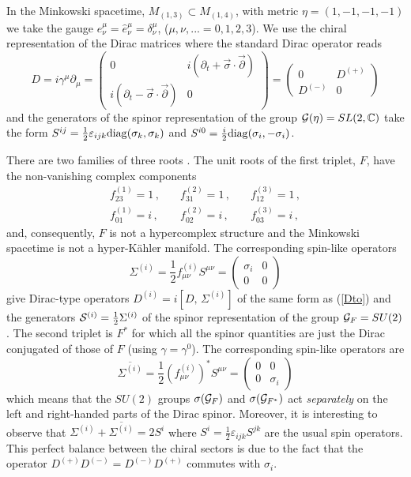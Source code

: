 \documentclass[a4paper,12pt]{article}
\begin{document}
In the Minkowski spacetime, $M_{(1,3)}\subset M_{(1,4)}$, with 
metric $\eta=(1,-1,-1,-1)$ we take the gauge 
$e^{\mu}_{\nu}=\hat e^{\mu}_{\nu}=\delta^{\mu}_{\nu}$, ($\mu,\nu,...=0,1,2,3$). 
We use the chiral representation of the Dirac matrices where the standard 
Dirac operator reads
\begin{equation}
D=i\gamma^{\mu}\partial_{\mu}=\left( 
\begin{array}{cc}
0&i(\partial_t+\vec{\sigma}\cdot\vec{\partial})\\
i(\partial_t-\vec{\sigma}\cdot\vec{\partial})&0
\end{array}\right)=\left(
\begin{array}{cc}
0&D^{(+)}\\
D^{(-)}&0
\end{array}\right)
\end{equation}
and the generators of the spinor representation of the group 
${\cal G}(\eta) = SL(2,{\Bbb C})$ take the form
$S^{ij}=\frac{1}{2}\varepsilon_{ijk}{\rm diag}(\sigma_k, \sigma_k)$
and $S^{i0}=\frac{i}{2}{\rm diag}(\sigma_i,-\sigma_i)$.

There are two families of three roots \cite{K2}. The unit roots of the first 
triplet, $F$, have the non-vanishing complex components \cite{K2}
\begin{eqnarray}
f^{(1)}_{23}=1\,,\quad&f^{(2)}_{31}=1\,,&\quad f^{(3)}_{12}=1\,,\\
f^{(1)}_{01}=i\,,\quad&f^{(2)}_{02}=i\,,&\quad f^{(3)}_{03}=i\,,
\end{eqnarray}
and, consequently, $F$ is not a hypercomplex structure and the Minkowski 
spacetime is not a hyper-K\" ahler manifold.
The corresponding spin-like operators
\begin{equation}
\Sigma^{(i)}=\frac{1}{2}f^{(i)}_{\mu\nu}S^{\mu\nu}=\left(
\begin{array}{cc}
\sigma_i&0\\
0&0
\end{array}\right)
\end{equation}
give Dirac-type operators $D^{(i)}=i[D,\,\Sigma^{(i)}]$ of the same form as 
(\ref{Dto})
and the generators ${\cal S}^{(i)}=\frac{1}{2}\Sigma^{(i)}$ of the spinor 
representation of the group ${\cal G}_F=SU(2)$. 
The second triplet is $F^*$ for which all the spinor quantities are 
just the Dirac conjugated of those of $F$ (using $\gamma=\gamma^0$). 
The corresponding spin-like operators are   
\begin{equation}
\overline{\Sigma^{(i)}}=\frac{1}{2}\left(f^{(i)}_{\mu\nu}\right)^{*}S^{\mu\nu}
=\left(
\begin{array}{cc}
0&0\\
0&\sigma_i
\end{array}\right)
\end{equation}
which means that the $SU(2)$ groups $\sigma({\cal G}_F)$ and 
$\sigma({\cal G}_{F^*})$ act {\em separately} on the left and right-handed 
parts of the Dirac spinor. Moreover, it is interesting to observe that 
$\Sigma^{(i)}+\overline{\Sigma^{(i)}}=2 S^i$  where 
$S^i=\frac{1}{2}\varepsilon_{ijk}S^{jk}$ are the usual spin operators.
This perfect balance between the chiral sectors is due to the fact that 
the operator $D^{(+)}D^{(-)}=D^{(-)}D^{(+)}$ commutes with $\sigma_i$. 
\end{document}
